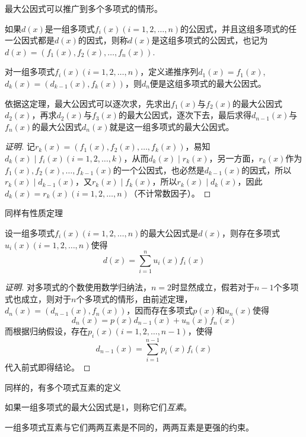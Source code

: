 最大公因式可以推广到多个多项式的情形。

\begin{definition}
  如果$d(x)$是一组多项式$f_i(x)(i=1,2,\ldots,n)$的公因式，并且这组多项式的任一公因式都是$d(x)$的因式，则称$d(x)$是这组多项式的公因式，也记为$d(x)=(f_1(x),f_2(x),\ldots,f_n(x))$.
\end{definition}

\begin{theorem}
  对一组多项式$f_i(x)(i=1,2,\ldots,n)$，定义递推序列$d_1(x)=f_1(x)$,$d_k(x)=(d_{k-1}(x), f_k(x))$，则$d_n$便是这组多项式的最大公因式。
\end{theorem}

依据这定理，最大公因式可以逐次求，先求出$f_1(x)$与$f_2(x)$的最大公因式$d_2(x)$，再求$d_2(x)$与$f_3(x)$的最大公因式，逐次下去，最后求得$d_{n-1}(x)$与$f_n(x)$的最大公因式$d_n(x)$就是这一组多项式的最大公因式。

\begin{proof}[证明]
  记$r_k(x)=(f_1(x),f_2(x),\ldots,f_k(x))$，易知$d_k(x) \mid f_i(x)(i=1,2,\ldots,k)$，从而$d_k(x) \mid r_k(x)$，另一方面，$r_k(x)$作为$f_1(x),f_2(x),\ldots,f_{k-1}(x)$的一个公因式，也必然是$d_{k-1}(x)$的因式，所以$r_k(x) \mid d_{k-1}(x)$，又$r_k(x) \mid f_k(x)$，所以$r_k(x) \mid d_k(x)$，因此$d_k(x)=r_k(x)(i=1,2,\ldots,n)$（不计常数因子）。
\end{proof}

同样有性质定理
\begin{theorem}
  设一组多项式$f_i(x)(i=1,2,\ldots,n)$的最大公因式是$d(x)$，则存在多项式$u_i(x)(i=1,2,\ldots,n)$使得
  \[ d(x) = \sum_{i=1}^n u_i(x)f_i(x) \]
\end{theorem}

\begin{proof}[证明]
  对多项式的个数使用数学归纳法，$n=2$时显然成立，假若对于$n-1$个多项式也成立，则对于$n$个多项式的情形，由前述定理，$d_n(x)=(d_{n-1}(x), f_n(x))$，因而存在多项式$p(x)$和$u_n(x)$使得
  \[ d_n(x) = p(x)d_{n-1}(x) + u_n(x)f_n(x) \]
  而根据归纳假设，存在$p_i(x)(i=1,2,\ldots,n-1)$，使得
  \[ d_{n-1}(x) = \sum_{i=1}^{n-1}p_i(x)f_i(x) \]
  代入前式即得结论。
\end{proof}

同样的，有多个项式互素的定义
\begin{definition}
  如果一组多项式的最大公因式是1，则称它们\emph{互素}。
\end{definition}

一组多项式互素与它们两两互素是不同的，两两互素是更强的约束。

